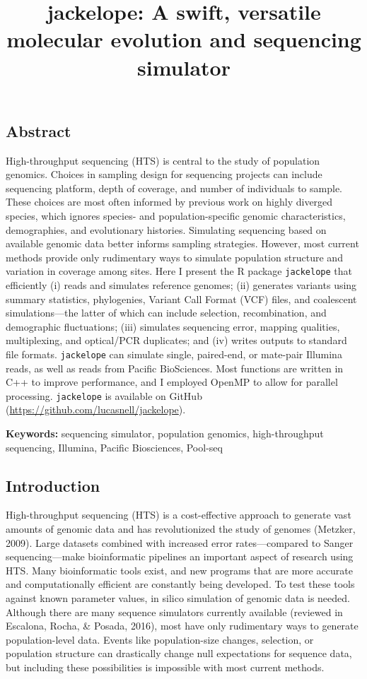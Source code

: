 \documentclass[12pt,]{article}
\title{jackelope: A swift, versatile molecular evolution and sequencing
simulator}
\author{}
\date{}
\begin{document}
\maketitle

\hypertarget{abstract}{%
\subsection{Abstract}\label{abstract}}

High-throughput sequencing (HTS) is central to the study of population
genomics. Choices in sampling design for sequencing projects can include
sequencing platform, depth of coverage, and number of individuals to
sample. These choices are most often informed by previous work on highly
diverged species, which ignores species- and population-specific genomic
characteristics, demographies, and evolutionary histories. Simulating
sequencing based on available genomic data better informs sampling
strategies. However, most current methods provide only rudimentary ways
to simulate population structure and variation in coverage among sites.
Here I present the R package \texttt{jackelope} that efficiently (i)
reads and simulates reference genomes; (ii) generates variants using
summary statistics, phylogenies, Variant Call Format (VCF) files, and
coalescent simulations---the latter of which can include selection,
recombination, and demographic fluctuations; (iii) simulates sequencing
error, mapping qualities, multiplexing, and optical/PCR duplicates; and
(iv) writes outputs to standard file formats. \texttt{jackelope} can
simulate single, paired-end, or mate-pair Illumina reads, as well as
reads from Pacific BioSciences. Most functions are written in C++ to
improve performance, and I employed OpenMP to allow for parallel
processing. \texttt{jackelope} is available on GitHub
(\url{https://github.com/lucasnell/jackelope}).

\textbf{Keywords:} sequencing simulator, population genomics,
high-throughput sequencing, Illumina, Pacific Biosciences, Pool-seq

\hypertarget{introduction}{%
\subsection{Introduction}\label{introduction}}

High-throughput sequencing (HTS) is a cost-effective approach to
generate vast amounts of genomic data and has revolutionized the study
of genomes (Metzker, 2009). Large datasets combined with increased error
rates---compared to Sanger sequencing---make bioinformatic pipelines an
important aspect of research using HTS. Many bioinformatic tools exist,
and new programs that are more accurate and computationally efficient
are constantly being developed. To test these tools against known
parameter values, in silico simulation of genomic data is needed.
Although there are many sequence simulators currently available
(reviewed in Escalona, Rocha, \& Posada, 2016), most have only
rudimentary ways to generate population-level data. Events like
population-size changes, selection, or population structure can
drastically change null expectations for sequence data, but including
these possibilities is impossible with most current methods.
\end{document}
